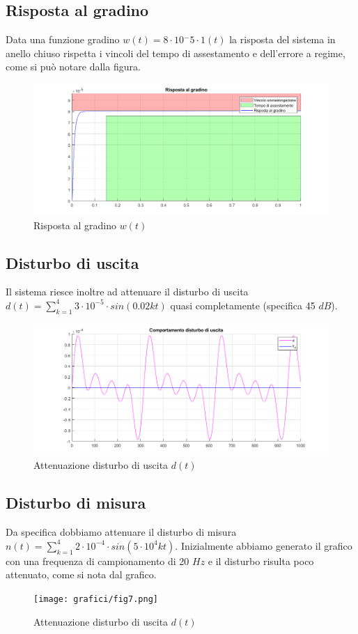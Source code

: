 \documentclass{article}
\begin{document}
\subsection{Risposta al gradino}
Data una funzione gradino $w(t)=8\cdot10{^-5}\cdot1(t)$ la risposta del sistema in anello chiuso rispetta i vincoli del tempo di assestamento e dell'errore a regime, come si può notare dalla figura.
\begin{figure}[!h]
\centering
\includegraphics[width=1\textwidth]{grafici/fig4.png}
\caption{\label{fig:orbit}Risposta al gradino $w(t)$}
\end{figure}

\subsection{Disturbo di uscita}
Il sistema riesce inoltre ad attenuare il disturbo di uscita $d(t)=\sum_{k=1}^4 3\cdot10^{-5}\cdot sin(0.02kt)$ quasi completamente (specifica 45 $dB$).
\begin{figure}[!h]
\centering
\includegraphics[width=1\textwidth]{grafici/fig5.png}
\caption{\label{fig:orbit}Attenuazione disturbo di uscita $d(t)$}
\end{figure}

\subsection{Disturbo di misura}
Da specifica dobbiamo attenuare il disturbo di misura $n(t)=\sum_{k=1}^4 2\cdot10^{-4}\cdot sin(5\cdot 10^4kt)$. Inizialmente abbiamo generato il grafico con una frequenza di campionamento di 20 $Hz$ e il disturbo risulta poco attenuato, come si nota dal grafico.
\\
\begin{figure}[!h]
\centering
\texttt{[image: grafici/fig7.png]}
\caption{\label{fig:orbit}Attenuazione disturbo di uscita $d(t)$}
\end{figure}
\end{document}
